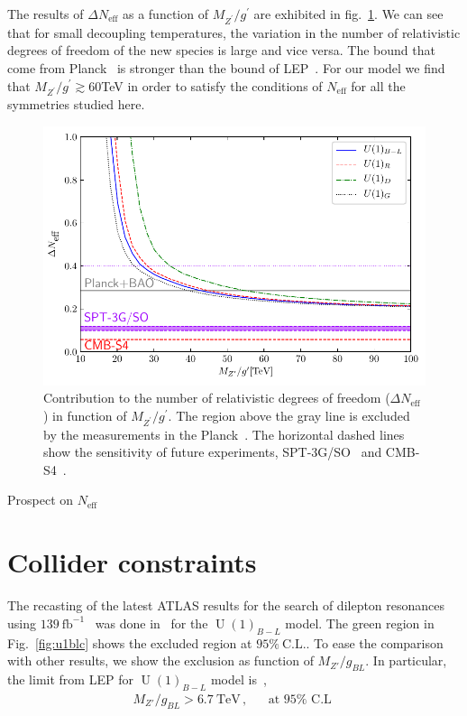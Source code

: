 \documentclass[12pt]{article}
\begin{document}
The results of $\Delta N_{\text{eff}}$ as a function of $M_{Z^{\prime}}/g^{\prime}$ are exhibited in fig.~\ref{fig:Neff}. We can see that for small decoupling temperatures, the variation in the number of relativistic degrees of freedom of the new species is large and vice versa. The bound that come from Planck~\cite{Aghanim:2018eyx} is stronger than the bound of LEP~\cite{Alioli:2017nzr}. For our model we find that $M_{Z^{\prime}}/g^{\prime} \gtrsim 60$TeV in order to satisfy the conditions of $N_{\text{eff}}$ for all the symmetries studied here.

%
\begin{figure}
\centering
\includegraphics[scale=0.8]{D_Neff.pdf}
\caption{Contribution to the number of relativistic degrees of freedom ($\Delta N_{\text{eff}}$) in function of $M_{Z^{\prime}}/g^{\prime}$. The region above the gray line is excluded by the measurements in the Planck~\cite{Aghanim:2018eyx}. The horizontal dashed lines show the sensitivity of future experiments, SPT-3G/SO~\cite{Benson:2014qhw} and CMB-S4~\cite{Abitbol:2019nhf}. }
\label{fig:Neff}
\end{figure}

Prospect on $N_{\text{eff}}$~\cite{Abazajian:2019oqj}



\section{Collider constraints}
The recasting of the latest ATLAS results for the search of dilepton resonances using $139\ \text{fb}^{-1}$~\cite{Aad:2019fac} was done
in~\cite{Aad:2019fac} for the $\operatorname{U}(1)_{B-L}$ model.
The green region in Fig.~\ref{fig:u1blc} shows the excluded region at $95\%\ \text{C.L.}$. To ease the comparison with other results, we show the exclusion as function of $M_{Z'}/g_{BL}$. In particular, the limit from LEP for $\operatorname{U}(1)_{B-L}$ model is~\cite{Heeck:2014zfa}, 
\begin{align}
  M_{Z'}/g_{BL}>6.7\ \text{TeV}\,,&&\text{at $95\%$ C.L }
\end{align}
\end{document}
